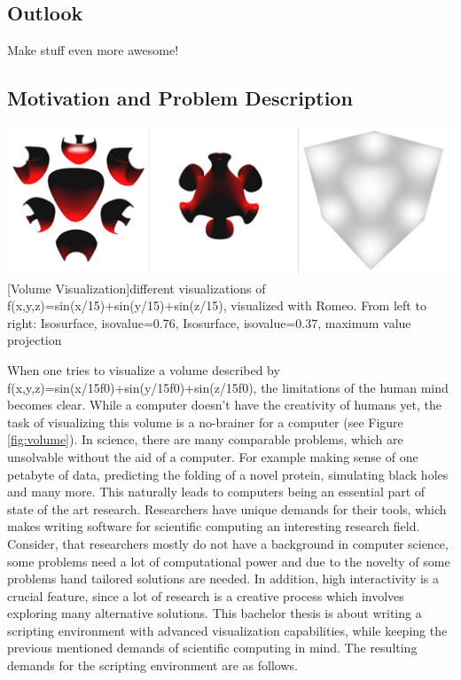 \subsection{Outlook}
Make stuff even more awesome!


\subsection{Motivation and Problem Description}

\vspace{1em}
\begin{minipage}{\linewidth}
    \centering
    \includegraphics[width=0.7\linewidth]{Bilder/surfaces.png}
    [Volume Visualization]{different visualizations of f(x,y,z)=sin(x/15)+sin(y/15)+sin(z/15), visualized with Romeo. From left to right: Isosurface, isovalue=0.76, Isosurface, isovalue=0.37, maximum value projection}
    \label{fig:volume}
\end{minipage}

When one tries to visualize a volume described by f(x,y,z)=sin(x/15f0)+sin(y/15f0)+sin(z/15f0), the limitations of the human mind becomes clear. While a computer doesn't have the creativity of humans yet, the task of visualizing this volume is a no-brainer for a computer (see Figure \ref{fig:volume}).
In science, there are many comparable problems, which are unsolvable without the aid of a computer.
For example making sense of one petabyte of data, predicting the folding of a novel protein, simulating black holes and many more.
This naturally leads to computers being an essential part of state of the art research.
Researchers have unique demands for their tools, which makes writing software for scientific computing an interesting research field.
Consider, that researchers mostly do not have a background in computer science, some problems need a lot of computational power and due to the novelty of some problems hand tailored solutions are needed. In addition, high interactivity is a crucial feature, since a lot of research is a creative process which involves exploring many alternative solutions.
This bachelor thesis is about writing a scripting environment with advanced visualization capabilities, while keeping the previous mentioned demands of scientific computing in mind.
The resulting demands for the scripting environment are as follows.

